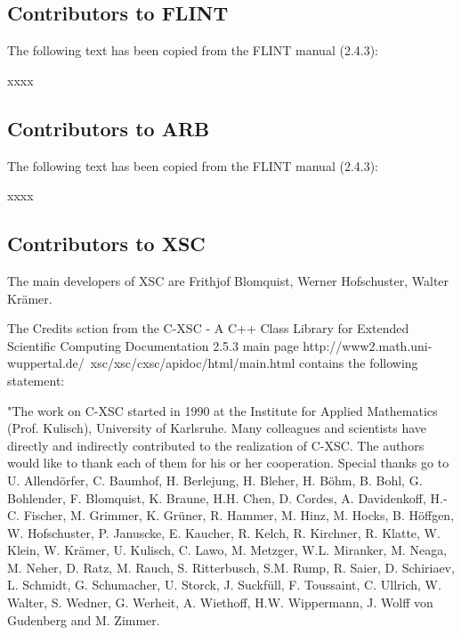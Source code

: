 
\subsection{Contributors to FLINT}
\label{Contributors to FLINT}
The following text has been copied from the FLINT manual (2.4.3):

\vpara
xxxx


\subsection{Contributors to ARB}
\label{Contributors to ARB}
The following text has been copied from the FLINT manual (2.4.3):

\vpara
xxxx

%
%
%
%



\subsection{Contributors to XSC}
\label{Contributors to XSC}
The main developers of XSC are Frithjof Blomquist, Werner Hofschuster, Walter Kr\"amer.

\vpara
The Credits sction from the C-XSC - A C++ Class Library for Extended Scientific Computing Documentation 2.5.3 main page http://www2.math.uni-wuppertal.de/~xsc/xsc/cxsc/apidoc/html/main.html contains the following statement:

\vpara
"The work on C-XSC started in 1990 at the Institute for Applied Mathematics (Prof. Kulisch), University of Karlsruhe. Many colleagues and scientists have directly and indirectly contributed to the realization of C-XSC. The authors would like to thank each of them for his or her cooperation. Special thanks go to U. Allendörfer, C. Baumhof, H. Berlejung, H. Bleher, H. Böhm, B. Bohl, G. Bohlender, F. Blomquist, K. Braune, H.H. Chen, D. Cordes, A. Davidenkoff, H.-C. Fischer, M. Grimmer, K. Grüner, R. Hammer, M. Hinz, M. Hocks, B. Höffgen, W. Hofschuster, P. Januscke, E. Kaucher, R. Kelch, R. Kirchner, R. Klatte, W. Klein, W. Krämer, U. Kulisch, C. Lawo, M. Metzger, W.L. Miranker, M. Neaga, M. Neher, D. Ratz, M. Rauch, S. Ritterbusch, S.M. Rump, R. Saier, D. Schiriaev, L. Schmidt, G. Schumacher, U. Storck, J. Suckfüll, F. Toussaint, C. Ullrich, W. Walter, S. Wedner, G. Werheit, A. Wiethoff, H.W. Wippermann, J. Wolff von Gudenberg and M. Zimmer.

